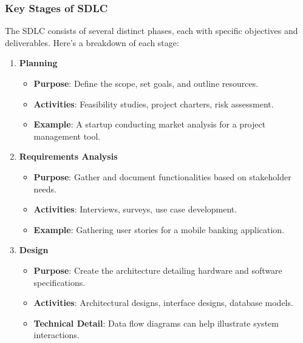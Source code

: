 \documentclass{beamer}
\begin{document}
\begin{frame}[fragile]
    \frametitle{Key Stages of SDLC}
    The SDLC consists of several distinct phases, each with specific objectives and deliverables. Here’s a breakdown of each stage:
    \begin{enumerate}
        \item \textbf{Planning}
        \begin{itemize}
            \item \textbf{Purpose}: Define the scope, set goals, and outline resources.
            \item \textbf{Activities}: Feasibility studies, project charters, risk assessment.
            \item \textbf{Example}: A startup conducting market analysis for a project management tool.
        \end{itemize}
        
        \item \textbf{Requirements Analysis}
        \begin{itemize}
            \item \textbf{Purpose}: Gather and document functionalities based on stakeholder needs.
            \item \textbf{Activities}: Interviews, surveys, use case development.
            \item \textbf{Example}: Gathering user stories for a mobile banking application.
        \end{itemize}
        
        \item \textbf{Design}
        \begin{itemize}
            \item \textbf{Purpose}: Create the architecture detailing hardware and software specifications.
            \item \textbf{Activities}: Architectural designs, interface designs, database models.
            \item \textbf{Technical Detail}: Data flow diagrams can help illustrate system interactions.
        \end{itemize}
    \end{enumerate}
\end{frame}
\end{document}
